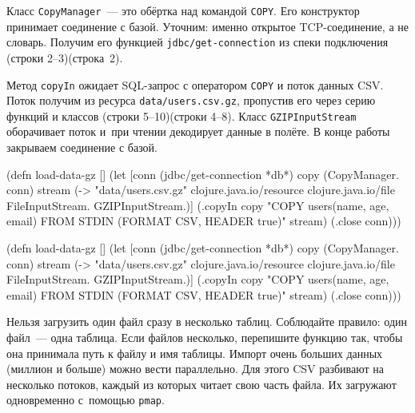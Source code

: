 Класс \verb|CopyManager|~--- это обёртка над командой \verb|COPY|. Его
конструктор принимает соединение с базой. Уточним: именно открытое
TCP-соединение, а не словарь. Получим его функцией \verb|jdbc/get-connection| из
спеки подключения \ifnarrow(строки 2--3)\else(строка~2)\fi.

Метод \verb|copyIn| ожидает SQL-запрос с оператором \verb|COPY| и поток данных
CSV. Поток получим из ресурса \verb|data/users.csv.gz|, пропустив его через
серию функций и классов \ifnarrow(строки 5--10)\else(строки
4--8)\fi. Класс \verb|GZIPInputStream| оборачивает поток и~при чтении декодирует
данные в полёте.  В конце работы закрываем соединение с базой.


\ifnarrow

\begin{english}
  \begin{clojure/lines}
(defn load-data-gz []
  (let [conn
        (jdbc/get-connection *db*)
        copy (CopyManager. conn)
        stream
        (-> "data/users.csv.gz"
            clojure.java.io/resource
            clojure.java.io/file
            FileInputStream.
            GZIPInputStream.)]
   (.copyIn copy
     "COPY users(name, age, email)
      FROM STDIN
      (FORMAT CSV, HEADER true)"
     stream)
   (.close conn)))
  \end{clojure/lines}
\end{english}

\else

\begin{english}
  \begin{clojure/lines}
(defn load-data-gz []
  (let [conn (jdbc/get-connection *db*)
        copy (CopyManager. conn)
        stream (-> "data/users.csv.gz"
                   clojure.java.io/resource
                   clojure.java.io/file
                   FileInputStream.
                   GZIPInputStream.)]
    (.copyIn copy "COPY users(name, age, email)
                   FROM STDIN (FORMAT CSV, HEADER true)"
             stream)
    (.close conn)))
  \end{clojure/lines}
\end{english}

\fi

\mnoindent
Нельзя загрузить один файл сразу в несколько таблиц. Соблюдайте правило: один
файл~--- одна таблица. Если файлов несколько, перепишите функцию так, чтобы она
принимала путь к файлу и имя таблицы. Импорт очень больших данных (миллион и
больше) можно вести параллельно. Для этого CSV разбивают на несколько потоков,
каждый из которых читает свою часть файла. Их загружают одновременно с~помощью
\verb|pmap|.

